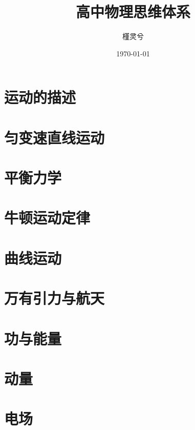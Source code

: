 \documentclass[12pt,UTF-8]{UtopiaPhyCyclus_book}
\title{高中物理思维体系}
\author{槿灵兮}
\date{\today}
\begin{document}
\thispagestyle{nohf}




\thispagestyle{nohf}
\clearpage
\tableofcontents
\thispagestyle{nohf}
\newpage

\setcounter{page}{1}


\chapter{运动的描述}


\chapter{匀变速直线运动}


\chapter{平衡力学}


\chapter{牛顿运动定律}


\chapter{曲线运动}


\chapter{万有引力与航天}


\chapter{功与能量}


\chapter{动量}


\chapter{电场}

\end{document}
